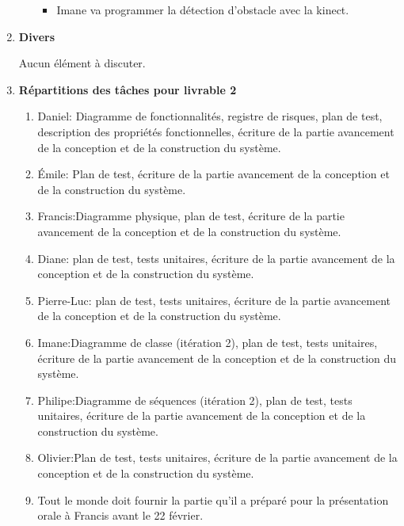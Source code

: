 \documentclass[12pt]{ULojpv}
\begin{document}
\begin{enumerate}
\begin{enumerate}
\begin{itemize}
\item Imane va programmer la détection d'obstacle avec la kinect.
\end{itemize}

\end{enumerate}





\item \textbf{Divers}

Aucun élément à discuter.
\\

\item \textbf{Répartitions des tâches pour livrable 2}

\begin{enumerate}

\item Daniel: Diagramme de fonctionnalités, registre de risques, plan de test, description des propriétés fonctionnelles, écriture de la partie avancement de la conception et de la construction du système.
\item Émile: Plan de test, écriture de la partie avancement de la conception et de la construction du système.
\item Francis:Diagramme physique, plan de test, écriture de la partie avancement de la conception et de la construction du système.
\item Diane: plan de test, tests unitaires, écriture de la partie avancement de la conception et de la construction du système.
\item Pierre-Luc: plan de test, tests unitaires, écriture de la partie avancement de la conception et de la construction du système.
\item Imane:Diagramme de classe (itération 2), plan de test, tests unitaires, écriture de la partie avancement de la conception et de la construction du système.
\item Philipe:Diagramme de séquences (itération 2), plan de test, tests unitaires, écriture de la partie avancement de la conception et de la construction du système.
\item Olivier:Plan de test, tests unitaires, écriture de la partie avancement de la conception et de la construction du système.
\item Tout le monde doit fournir la partie qu'il a préparé pour la présentation orale à Francis avant le 22 février.
\end{enumerate}



\end{enumerate}
\end{document}
